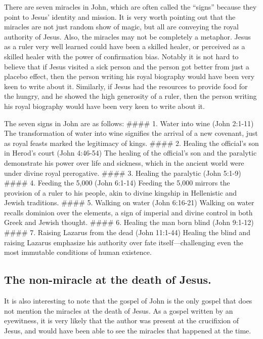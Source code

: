There are seven miracles in John, which are often called the ``signs'' because they point to Jesus' identity and mission.
It is very worth pointing out that the miracles are not just random show of magic, but all are conveying the royal authority of Jesus.
Also, the miracles may not be completely a metaphor.
Jesus as a ruler very well learned could have been a skilled healer, or perceived as a skilled healer with the power of confirmation bias.
Notably it is not hard to believe that if Jesus visited a sick person and the person got better from just a placebo effect, then the person writing his royal biography would have been very keen to write about it.
Similarly, if Jesus had the resources to provide food for the hungry, and he showed the high generosity of a ruler, then the person writing his royal biography would have been very keen to write about it.

The seven signs in John are as follows: \#\#\#\# 1.
Water into wine (John 2:1-11) The transformation of water into wine signifies the arrival of a new covenant, just as royal feasts marked the legitimacy of kings.
\#\#\#\# 2.
Healing the official's son in Herod's court (John 4:46-54) The healing of the official's son and the paralytic demonstrate his power over life and sickness, which in the ancient world were under divine royal prerogative.
\#\#\#\# 3.
Healing the paralytic (John 5:1-9) \#\#\#\# 4.
Feeding the 5,000 (John 6:1-14) Feeding the 5,000 mirrors the provision of a ruler to his people, akin to divine kingship in Hellenistic and Jewish traditions.
\#\#\#\# 5.
Walking on water (John 6:16-21) Walking on water recalls dominion over the elements, a sign of imperial and divine control in both Greek and Jewish thought.
\#\#\#\# 6.
Healing the man born blind (John 9:1-12) \#\#\#\# 7.
Raising Lazarus from the dead (John 11:1-44) Healing the blind and raising Lazarus emphasize his authority over fate itself---challenging even the most immutable conditions of human existence.

\subsection{The non-miracle at the death of Jesus.}\label{subsec:the-non-miracle-at-the-death-of-jesus.}

It is also interesting to note that the gospel of John is the only gospel that does not mention the miracles at the death of Jesus.
As a gospel written by an eyewitness, it is very likely that the author was present at the crucifixion of Jesus, and would have been able to see the miracles that happened at the time.

